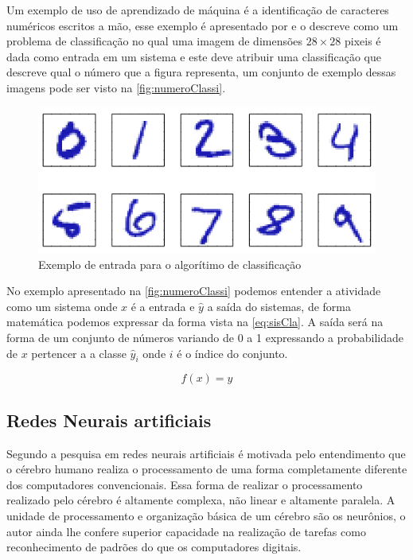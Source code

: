 \documentclass[
    12pt,
    oneside,
    a4paper,
    english,
    brazil
]{abntex2}
\begin{document}
Um exemplo de uso de aprendizado de máquina é a identificação de caracteres
numéricos escritos a mão, esse exemplo é apresentado por
 e o descreve como um problema de classificação no
qual uma imagem de dimensões $28 \times 28$ pixeis é dada como entrada em um
sistema e este deve atribuir uma classificação que descreve qual o número
que a figura representa, um conjunto de exemplo dessas imagens pode ser visto
na \autoref{fig:numeroClassi}.

\begin{figure}
    \centering
    \caption{Exemplo de entrada para o algorítimo de
        classificação}\label{fig:numeroClassi}
    \includegraphics[width=.5\linewidth]{images/numeroClassificacao.png}
\end{figure}

No exemplo apresentado na \autoref{fig:numeroClassi} podemos entender a
atividade como um sistema onde $x$ é a entrada e $\hat{y}$ a saída do sistemas,
de forma matemática podemos expressar da forma vista na \autoref{eq:sisCla}. A
saída será na forma de um conjunto de números variando de 0 a 1 expressando a
probabilidade de $x$ pertencer a a classe $\hat{y}_i$ onde $i$ é o índice do
conjunto.

\begin{equation}
    \label{eq:sisCla}
    f(x) = \hat{y}
\end{equation}

\subsection{Redes Neurais artificiais}

Segundo  a pesquisa em redes neurais artificiais é motivada
pelo entendimento que o cérebro humano realiza o processamento de uma forma
completamente diferente dos computadores convencionais. Essa forma de realizar
o processamento realizado pelo cérebro é altamente complexa, não linear e
altamente paralela. A unidade de processamento e organização básica de um
cérebro são os neurônios, o autor ainda lhe confere superior capacidade na
realização de tarefas como reconhecimento de padrões do que os computadores
digitais.
\end{document}
